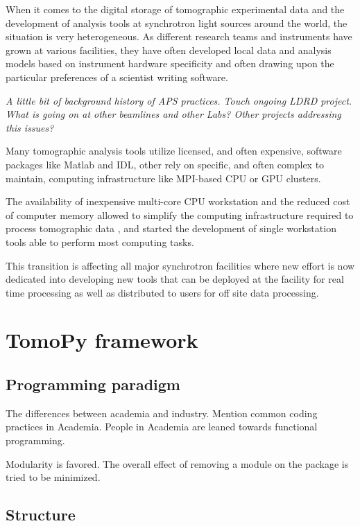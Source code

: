 \documentclass[pdf]{iucr}              %
\begin{document}
When it comes to the digital storage of tomographic experimental data and the development of analysis tools at synchrotron light sources around the world, the situation is very heterogeneous. As different research teams and instruments have grown at various facilities, they have often developed local data and analysis models based on instrument hardware specificity and often drawing upon the particular preferences of a scientist writing software. 

{\it A little bit of background history of APS practices. Touch ongoing LDRD project. What is going on at other beamlines and other Labs? Other projects addressing this issues?}

Many tomographic analysis tools utilize licensed, and often expensive, software packages like Matlab and IDL, other rely on specific, and often complex to maintain, computing infrastructure like MPI-based CPU or GPU clusters.

The availability of inexpensive multi-core CPU workstation and the reduced cost of computer memory  allowed to simplify the computing infrastructure required to process tomographic data \cite{rivers_spie_2012}, and started the development of single workstation tools able to perform most computing tasks. 

This transition is affecting all major synchrotron facilities where new effort is now dedicated into developing new tools that can be deployed at the facility for real time processing as well as distributed to users for off site data processing.



\section{TomoPy framework}
\subsection{Programming paradigm}

The differences between academia and industry. Mention common coding practices in Academia. People in Academia are leaned towards functional programming.

Modularity is favored. The overall effect of removing a module on the package is tried to be minimized.

\subsection{Structure}
\end{document}
